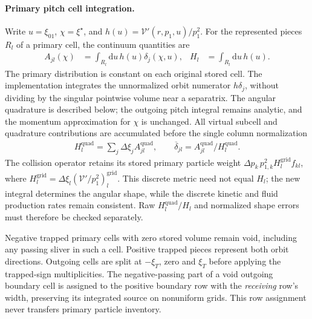 \documentclass[11pt,a4paper]{article}
\newcommand{\rd}{\ensuremath{\mathrm{d}}}
\begin{document}
\paragraph{Primary pitch cell integration.}
Write $u=\xi_{01}$, $\chi=\xi^\star$, and $h(u)=\mathcal{V}'(r,p_1,u)/p_1^2$.
For the represented pieces $R_l$ of a primary cell, the continuum quantities are
\begin{align}
 A_{jl}(\chi)&=\int_{R_l}\rd u\,h(u)\delta_j(\chi,u), &
 H_l&=\int_{R_l}\rd u\,h(u).
\end{align}
The primary distribution is constant on each original stored cell. The
implementation integrates the unnormalized orbit numerator $h\delta_j$,
without dividing by the singular pointwise volume near a separatrix. The angular quadrature is described below; the outgoing pitch integral
remains analytic, and the momentum approximation for $\chi$ is unchanged.
All virtual subcell and quadrature contributions are accumulated before the
single column normalization
\begin{align}
 H_l^{\mathrm{quad}}=\sum_j\Delta\xi_j A_{jl}^{\mathrm{quad}},\qquad
 \overline\delta_{jl}=A_{jl}^{\mathrm{quad}}/H_l^{\mathrm{quad}}.
\end{align}
The collision operator retains its stored primary particle weight
$\Delta p_k\,p_{1,k}^2 H_l^{\mathrm{grid}}f_{kl}$, where
$H_l^{\mathrm{grid}}=\Delta\xi_l(\mathcal{V}'/p_1^2)_l^{\mathrm{grid}}$.
This discrete metric need not equal $H_l$; the new integral determines the
angular shape, while the discrete kinetic and fluid production rates remain
consistent. Raw $H_l^{\mathrm{quad}}/H_l$ and normalized shape errors must
therefore be checked separately.

Negative trapped primary cells with zero stored volume remain void, including
any passing sliver in such a cell. Positive trapped pieces represent both orbit
directions. Outgoing cells are split at $-\xi_T$, zero and $\xi_T$ before
applying the trapped-sign multiplicities. The negative-passing part of a void
outgoing boundary cell is assigned to the positive boundary row with the
\emph{receiving} row's width, preserving its integrated source on nonuniform
grids. This row assignment never transfers primary particle inventory.
\end{document}
